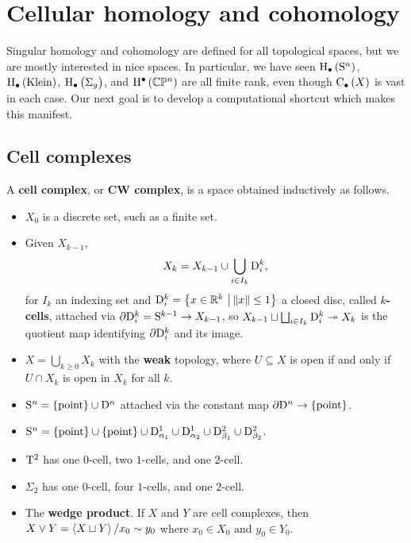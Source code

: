 \pagebreak

\section{Cellular homology and cohomology}


Singular homology and cohomology are defined for all topological spaces, but we are mostly interested in nice spaces. In particular, we have seen $ \H_\bullet\br{\S^n} $, $ \H_\bullet\br{\text{Klein}} $, $ \H_\bullet\br{\Sigma_g} $, and $ \H^\bullet\br{\CC\PP^n} $ are all finite rank, even though $ \C_\bullet\br{X} $ is vast in each case. Our next goal is to develop a computational shortcut which makes this manifest.

\subsection{Cell complexes}

\begin{definition*}
A \textbf{cell complex}, or \textbf{CW complex}, is a space obtained inductively as follows.
\begin{itemize}
\item $ X_0 $ is a discrete set, such as a finite set.
\item Given $ X_{k - 1} $,
$$ X_k = X_{k - 1} \cup \bigcup_{i \in I_k} \mathrm{D}_i^k, $$
for $ I_k $ an indexing set and $ \D_i^k = \cbr{x \in \RR^k \st \norm{x} \le 1} $ a closed disc, called \textbf{$ k $-cells}, attached via $ \partial\mathrm{D}_i^k = \mathrm{S}^{k - 1} \to X_{k - 1} $, so $ X_{k - 1} \sqcup \bigsqcup_{i \in I_k} \mathrm{D}_i^k \twoheadrightarrow X_k $ is the quotient map identifying $ \partial\mathrm{D}_i^k $ and its image.
\item $ X = \bigcup_{k \ge 0} X_k $ with the \textbf{weak} topology, where $ U \subseteq X $ is open if and only if $ U \cap X_k $ is open in $ X_k $ for all $ k $.
\end{itemize}
\end{definition*}

\begin{example*}
\hfill
\begin{itemize}
\item $ \S^n = \pt \cup \D^n $ attached via the constant map $ \da\D^n \to \pt $.
\item $ \S^n = \pt \cup \pt \cup \D_{\alpha_1}^1 \cup \D_{\alpha_2}^1 \cup \D_{\beta_1}^2 \cup \D_{\beta_2}^2 $.
\item $ \mathrm{T}^2 $ has one $ 0 $-cell, two $ 1 $-cells, and one $ 2 $-cell.
\item $ \Sigma_2 $ has one $ 0 $-cell, four $ 1 $-cells, and one $ 2 $-cell.
\item The \textbf{wedge product}. If $ X $ and $ Y $ are cell complexes, then $ X \vee Y = \left\langle X \sqcup Y \right\rangle / x_0 \sim y_0 $ where $ x_0 \in X_0 $ and $ y_0 \in Y_0 $.
\end{itemize}
\end{example*}

